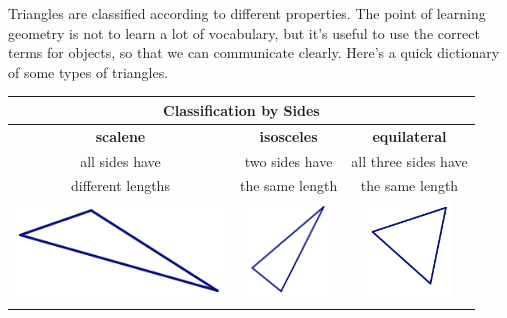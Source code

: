 \documentclass[12pt, reqno]{amsart}
\theoremstyle{remark}
\theoremstyle{definition}
\numberwithin{equation}{section}  %
\begin{document}
\newpage

Triangles are classified according to different properties.  The point of learning geometry is not to learn a lot of vocabulary, but it's useful to use the correct terms for objects, so that we can communicate clearly.  Here's a quick dictionary of some types of triangles.

\bigskip
\bigskip

\begin{center}


\begin{tabular}{c|c|c}\hline
\multicolumn{3}{c}{\bf Classification by Sides}\\
\hline\hline
{\bf scalene} & {\bf isosceles} & {\bf equilateral }  \\
\hline
all sides have  & two sides have  & all three sides have \\
different lengths & the same length & the same length\\
\hline
\includegraphics[height=2.5cm]{scalene} & 
\includegraphics[height=2.5cm]{isos} &
\includegraphics[height=2.5cm]{equilat}  \\
\hline\label{def:trisides}
\end{tabular}


\bigskip
\bigskip
\bigskip



\end{center}
\end{document}
